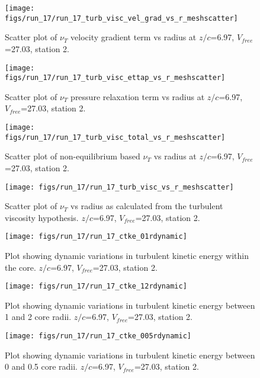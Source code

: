 \begin{figure}[H]
\centering
\texttt{[image: figs/run\_17/run\_17\_turb\_visc\_vel\_grad\_vs\_r\_meshscatter]}
\caption{Scatter plot of $\nu_T$ velocity gradient term vs radius at $z/c$=6.97, $V_{free}$=27.03, station 2.}
\end{figure}


\begin{figure}[H]
\centering
\texttt{[image: figs/run\_17/run\_17\_turb\_visc\_ettap\_vs\_r\_meshscatter]}
\caption{Scatter plot of $\nu_T$ pressure relaxation term vs radius at $z/c$=6.97, $V_{free}$=27.03, station 2.}
\end{figure}


\begin{figure}[H]
\centering
\texttt{[image: figs/run\_17/run\_17\_turb\_visc\_total\_vs\_r\_meshscatter]}
\caption{Scatter plot of non-equilibrium based $\nu_T$ vs radius at $z/c$=6.97, $V_{free}$=27.03, station 2.}
\end{figure}


\begin{figure}[H]
\centering
\texttt{[image: figs/run\_17/run\_17\_turb\_visc\_vs\_r\_meshscatter]}
\caption{Scatter plot of $\nu_T$ vs radius as calculated from the turbulent viscosity hypothesis. $z/c$=6.97, $V_{free}$=27.03, station 2.}
\end{figure}


\begin{figure}[H]
\centering
\texttt{[image: figs/run\_17/run\_17\_ctke\_01rdynamic]}
\caption{Plot showing dynamic variations in turbulent kinetic energy within the core. $z/c$=6.97, $V_{free}$=27.03, station 2.}
\end{figure}


\begin{figure}[H]
\centering
\texttt{[image: figs/run\_17/run\_17\_ctke\_12rdynamic]}
\caption{Plot showing dynamic variations in turbulent kinetic energy between 1 and 2 core radii. $z/c$=6.97, $V_{free}$=27.03, station 2.}
\end{figure}


\begin{figure}[H]
\centering
\texttt{[image: figs/run\_17/run\_17\_ctke\_005rdynamic]}
\caption{Plot showing dynamic variations in turbulent kinetic energy between 0 and 0.5 core radii. $z/c$=6.97, $V_{free}$=27.03, station 2.}
\end{figure}


